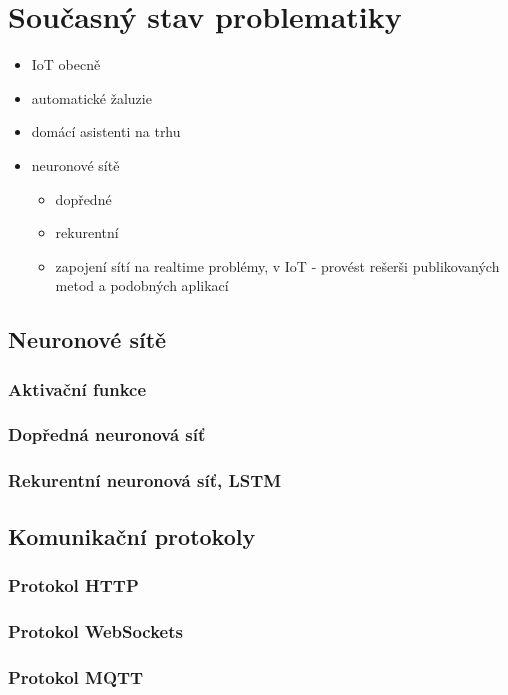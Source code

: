 \chapter{Současný stav problematiky} \label{chap:background}

\begin{itemize}
    \item IoT obecně
    \item automatické žaluzie
    \item domácí asistenti na trhu
    \item neuronové sítě
    \begin{itemize}
        \item dopředné
        \item rekurentní
        \item zapojení sítí na realtime problémy, v IoT - provést rešerši publikovaných metod a podobných aplikací  
    \end{itemize}  
\end{itemize}
\section{Neuronové sítě}
    \subsection{Aktivační funkce} \label{ssec:activationFcn}
    \subsection{Dopředná neuronová síť} \label{ssec:ffnn}
    \subsection{Rekurentní neuronová síť, LSTM} \label{ssec:rnn}
\section{Komunikační protokoly}
    \subsection{Protokol HTTP} \label{ssec:http}
    \subsection{Protokol WebSockets} \label{ssec:ws}
    \subsection{Protokol MQTT} \label{ssec:mqtt}
